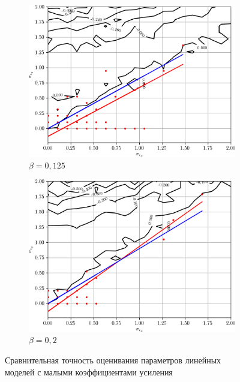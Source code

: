 \begin{figure}[p]
  \begin{subfigure}[b]{\linewidth}
    \centering
    \includegraphics[width=135mm]{fig/linear/param/beta-0,125_param-accs-approx.png}
    \caption{\( \beta = 0{,}125 \)}
  \end{subfigure}

  \vspace{2\baselineskip}
  \begin{subfigure}[b]{\linewidth}
    \centering
    \includegraphics[width=135mm]{fig/linear/param/beta-0,2_param-accs-approx.png}
    \caption{\( \beta = 0{,}2 \)}
  \end{subfigure}

  \vspace{\baselineskip}
  \caption{%
    Сравнительная точность оценивания параметров линейных \\
    моделей с малыми коэффициентами усиления
  }\label{fig:comparison_linear_params_beta-small}
\end{figure}

